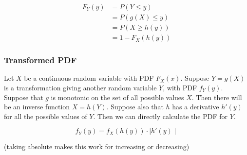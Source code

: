 \begin{align*}
    F_Y(y) & = P(Y \leq y)    \\
           & = P(g(X)\leq y)  \\
           & = P(X \geq h(y)) \\
           & = 1 - F_X(h(y))
\end{align*}

\subsubsection{Transformed PDF}

Let $X$ be a continuous random variable with PDF $F_X(x)$.
Suppose $Y=g(X)$ is a transformation giving another random variable $Y$, with PDF $f_Y(y)$.
Suppose that $g$ is monotonic on the set of all possible values $X$.
Then there will be an inverse function $X=h(Y)$.
Suppose also that $h$ has a derivative $h'(y)$ for all the possible values of $Y$. Then we can directly calculate the PDF for $Y$.

$$ f_Y(y) = f_X(h(y)) \cdot \mid h'(y) \mid $$

(taking absolute makes this work for increasing or decreasing)

